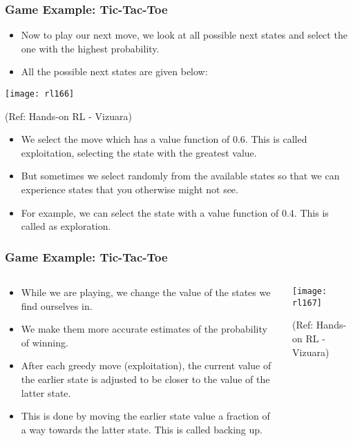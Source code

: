 \begin{frame}[fragile]\frametitle{Game Example: Tic-Tac-Toe}

\begin{itemize}
\item Now to play our next move, we look at all possible next states and select the one with the highest probability.
\item All the possible next states are given below:
\end{itemize}

\begin{center}
\texttt{[image: rl166]}

{\tiny (Ref: Hands-on RL - Vizuara)}

\end{center}


\begin{itemize}
\item We select the move which has a value function of 0.6. This is called exploitation, selecting the state with the greatest value.
\item But sometimes we select randomly from the available states so that we can experience states that you otherwise might not see.
\item For example, we can select the state with a value function of 0.4. This is called as exploration.
\end{itemize}
\end{frame}

\begin{frame}[fragile]\frametitle{Game Example: Tic-Tac-Toe}
\begin{columns}
    \begin{column}[T]{0.5\linewidth}
      \begin{itemize}
		\item While we are playing, we change the value of the states we find ourselves in. 
		\item We make them more accurate estimates of the probability of winning.
		\item After each greedy move (exploitation), the current value of the earlier state is adjusted to be closer to the value of the latter state. 
		\item This is done by moving the earlier state value a fraction of a way towards the latter state. This is called backing up.
	  \end{itemize}

    \end{column}
    \begin{column}[T]{0.5\linewidth}
		\begin{center}
		\texttt{[image: rl167]}

		{\tiny (Ref: Hands-on RL - Vizuara)}

		\end{center}
    \end{column}
  \end{columns}
\end{frame}

